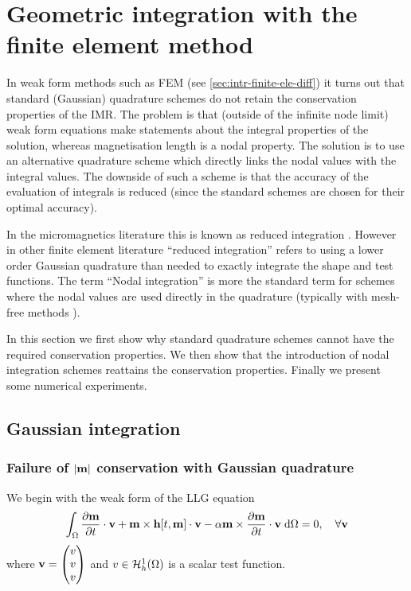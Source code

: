 
\chapter{Geometric integration with the finite element method}
\label{sec:nodal-integration}


In weak form methods such as FEM (see \autoref{sec:intr-finite-ele-diff}) it turns out that standard (\ie Gaussian) quadrature schemes do not retain the conservation properties of the IMR.
The problem is that (outside of the infinite node limit) weak form equations make statements about the integral properties of the solution, whereas magnetisation length is a nodal property.
The solution is to use an alternative quadrature scheme which directly links the nodal values with the integral values.
The downside of such a scheme is that the accuracy of the evaluation of integrals is reduced (since the standard schemes are chosen for their optimal accuracy).

In the micromagnetics literature this is known as reduced integration \cite{Cimrak2008}.
However in other finite element literature ``reduced integration'' refers to using a lower order Gaussian quadrature than needed to exactly integrate the shape and test functions.
The term ``Nodal integration'' is more the standard term for schemes where the nodal values are used directly in the quadrature (typically with mesh-free methods \eg \cite{Puso2008}).

In this section we first show why standard quadrature schemes cannot have the required conservation properties.
We then show that the introduction of nodal integration schemes reattains the conservation properties.
Finally we present some numerical experiments.


\section{Gaussian integration}

\subsection{Failure of $\left|{\mathbf{m}} \right|$ conservation with Gaussian quadrature}

\newcommand{\ipg}[2]{\intd{{#1} \cdot {#2}}}

We begin with the weak form of the LLG equation
\begin{equation}
  \label{eq:weak-llg}
  {\int_{\Omega} \frac{\partial \mathbf{m}}{\partial t}\cdot \mathbf{v}+ \mathbf{m}\times \mathbf{h}[t, \mathbf{m}] \cdot \mathbf{v}- \alpha\mathbf{m}\times \frac{\partial \mathbf{m}}{\partial t}\cdot \mathbf{v}{\; \text{d}}{\Omega}} = 0, \quad \forall \mathbf{v}
\end{equation}
where $\mathbf{v} = \begin{pmatrix} v \\ v \\ v \end{pmatrix}$ and $v \in {\mathcal{H}^1_h(\Omega)}$ is a scalar test function.

